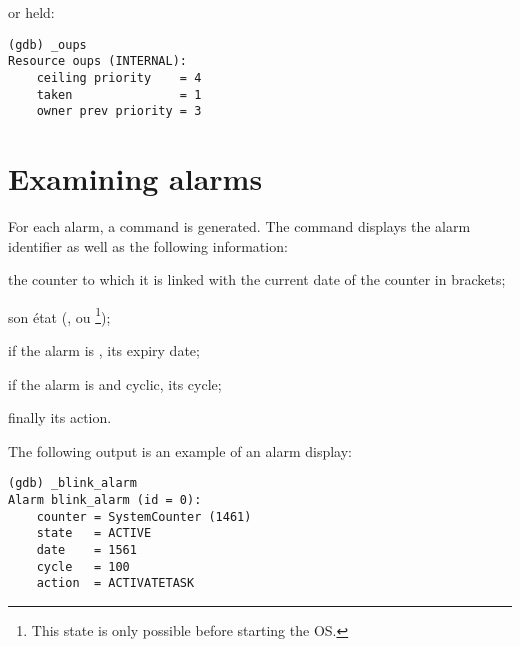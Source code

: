 or held:

\begin{lstlisting}
(gdb) _oups 
Resource oups (INTERNAL):
	ceiling priority    = 4
	taken               = 1
	owner prev priority = 3
\end{lstlisting} 

\section{Examining alarms}

For each alarm, a command  is generated. The command displays the alarm identifier as well as the following information:

\begin{pitemize}
\item the counter to which it is linked with the current date of the counter in brackets;
\item son état (,  ou \footnote{This state is only possible before starting the OS.});
\item if the alarm is , its expiry date;
\item if the alarm is  and cyclic, its cycle;
\item finally its action.
\end{pitemize}

The following output is an example of an alarm display:

\begin{lstlisting}
(gdb) _blink_alarm 
Alarm blink_alarm (id = 0):
	counter = SystemCounter (1461)
	state   = ACTIVE
	date    = 1561
	cycle   = 100
	action  = ACTIVATETASK
\end{lstlisting}
